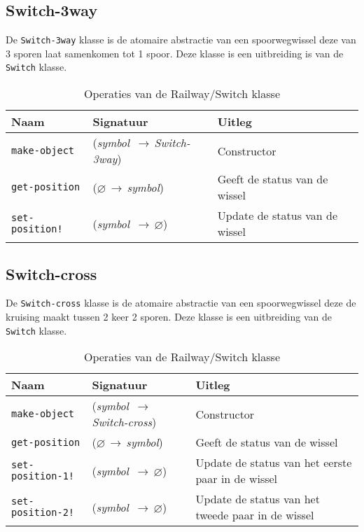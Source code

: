 \documentclass[a4paper, 11pt]{article}
\newcommand{\naar}{\,$\rightarrow$\,}
\renewcommand{\empty}{$\varnothing$}
\newcommand{\<}{\scriptsize\textless\normalsize}
\renewcommand{\>}{\scriptsize\textgreater\normalsize}
\begin{document}
\subsection{Switch-3way} %
De \texttt{Switch-3way} klasse is de atomaire abstractie van een spoorwegwissel deze van 3 sporen laat samenkomen tot 1 spoor. Deze klasse is een uitbreiding is van de \texttt{Switch} klasse.
\begin{table}[H]
	\begin{center}
		\begin{tabular}{|l l l|}
			\hline
			\textbf{Naam} & \textbf{Signatuur} & \textbf{Uitleg}\\
			\hline
			\texttt{make-object} & (\textit{symbol} \naar \textit{Switch-3way}) & Constructor\\
			\hline
			\texttt{get-position} & (\empty \naar \textit{symbol}) & Geeft de status van de wissel\\
			\texttt{set-position!} & (\textit{symbol} \naar \empty) & Update de status van de wissel\\
			\hline
		\end{tabular}
		\caption{Operaties van de Railway/Switch klasse}
	\end{center}
\end{table}

\subsection{Switch-cross} %
De \texttt{Switch-cross} klasse is de atomaire abstractie van een spoorwegwissel deze de kruising maakt tussen 2 keer 2 sporen. Deze klasse is een uitbreiding van de \texttt{Switch} klasse.
\begin{table}[H]
	\begin{center}
		\begin{tabular}{|l l l|}
			\hline
			\textbf{Naam} & \textbf{Signatuur} & \textbf{Uitleg}\\
			\hline
			\texttt{make-object} & (\textit{symbol} \naar \textit{Switch-cross}) & Constructor\\
			\hline
			\texttt{get-position} & (\empty \naar \textit{symbol}) & Geeft de status van de wissel\\
			\texttt{set-position-1!} & (\textit{symbol} \naar \empty) & Update de status van het eerste paar in de wissel\\
			\texttt{set-position-2!} & (\textit{symbol} \naar \empty) & Update de status van het tweede paar in de wissel\\
			\hline
		\end{tabular}
		\caption{Operaties van de Railway/Switch klasse}
	\end{center}
\end{table}
\end{document}
